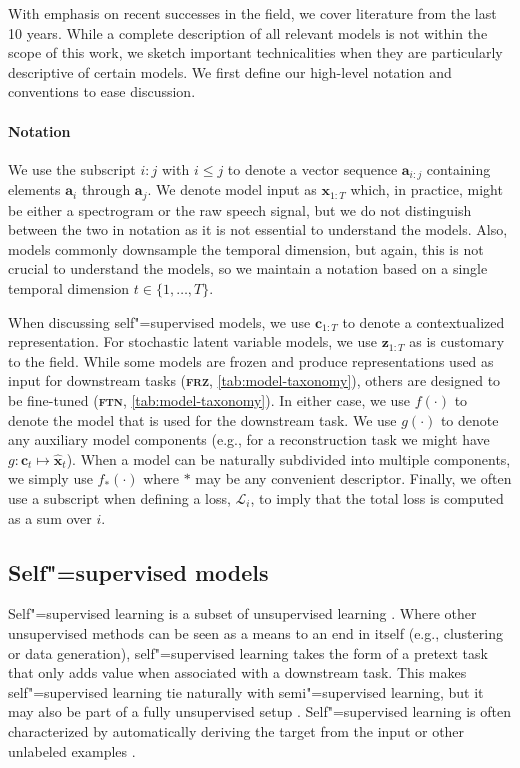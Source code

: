 {With emphasis on recent successes in the field, we cover literature from the last 10 years. While a complete description of all relevant models is not within the scope of this work, we sketch important technicalities when they are particularly descriptive of certain models. We first define our high-level notation and conventions to ease discussion.

\paragraph{Notation}
We use the subscript $i{:}j$ with $i{\leq}j$ to denote a vector sequence $\textbf{a}_{i:j}$ containing elements $\textbf{a}_{i}$ through $\textbf{a}_{j}$. We denote model input as $\mathbf{x}_{1:T}$ which, in practice, might be either a spectrogram or the raw speech signal, but we do not distinguish between the two in notation as it is not essential to understand the models. Also, models commonly downsample the temporal dimension, but again, this is not crucial to understand the models, so we maintain a notation based on a single temporal dimension $t\in\{1,\dots, T\}$.

When discussing self"=supervised models, we use $\mathbf{c}_{1:T}$ to denote a contextualized representation. For stochastic latent variable models, we use $\mathbf{z}_{1:T}$ as is customary to the field. 
While some models are frozen and produce representations used as input for downstream tasks (\textbf{\textsc{frz}}, \cref{tab:model-taxonomy}), others are designed to be fine-tuned (\textbf{\textsc{ftn}}, \cref{tab:model-taxonomy}). In either case, we use $f(\cdot)$ to denote the model that is used for the downstream task. We use $g(\cdot)$ to denote any auxiliary model components (e.g., for a reconstruction task we might have $g: \mathbf{c}_t \mapsto \hat{\mathbf{x}}_t$). When a model can be naturally subdivided into multiple components, we simply use $f_*(\cdot)$ where $*$ may be any convenient descriptor. Finally, we often use a subscript when defining a loss, $\mathcal{L}_i$, to imply that the total loss is computed as a sum over $i$.


\subsection{Self"=supervised models}
\label{sec:ssmodels}

Self"=supervised learning is a subset of unsupervised learning \parencite{tsai_selfsupervised_2021}. Where other unsupervised methods can be seen as a means to an end in itself (e.g., clustering or data generation), self"=supervised learning takes the form of a pretext task that only adds value when associated with a downstream task. This makes self"=supervised learning tie naturally with semi"=supervised learning, but it may also be part of a fully unsupervised setup \parencite{baevski_unsupervised_2021}. Self"=supervised learning is often characterized by automatically deriving the target from the input or other unlabeled examples \parencite{ouali_overview_2020}.

}

